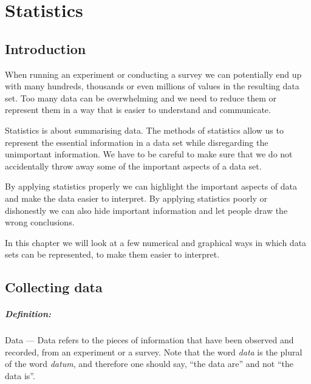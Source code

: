 \documentclass[a4paper,11pt]{report}
\def\Definition#1#2{\paragraph{Definition:} #1 --- #2}
\begin{document}
\chapter{Statistics}

\section{Introduction}

When running an experiment or conducting a survey we can potentially
end up with many hundreds, thousands or even millions of values in the
resulting data set. Too many data can be overwhelming and we need to
reduce them or represent them in a way that is easier to understand
and communicate.

Statistics is about summarising data. The methods of statistics allow
us to represent the essential information in a data set while
disregarding the unimportant information. We have to be careful to
make sure that we do not accidentally throw away some of the important
aspects of a data set.



By applying statistics properly we can highlight the important aspects
of data and make the data easier to interpret. By applying statistics
poorly or dishonestly we can also hide important information and let
people draw the wrong conclusions.

In this chapter we will look at a few numerical and graphical ways in
which data sets can be represented, to make them easier to interpret.

\section{Collecting data}
\Definition{Data}{Data refers to the pieces of information that have
  been observed and recorded, from an experiment or a survey. Note
  that the word {\em data} is the plural of the word {\em datum}, and
  therefore one should say, ``the data are'' and not ``the data is''.}
\end{document}
